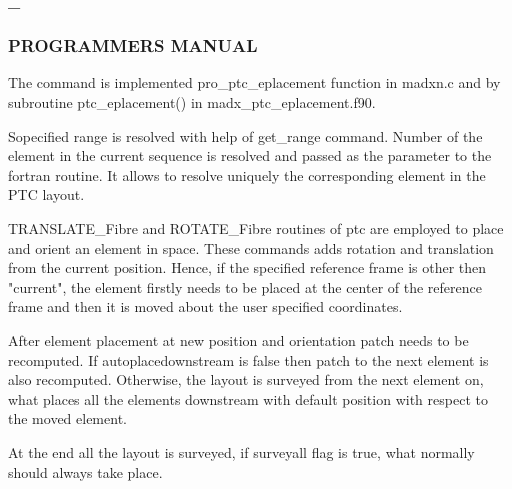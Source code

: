 \paragraph{\_  }




\subsubsection{ PROGRAMMERS MANUAL }

  The command is implemented pro\_ptc\_eplacement function in madxn.c and  by subroutine ptc\_eplacement() in madx\_ptc\_eplacement.f90. 

 Sopecified range is resolved with help of get\_range command. Number of the element in the current sequence is resolved and passed as the parameter to the fortran routine. It allows to resolve uniquely the corresponding element in the PTC layout. 

 TRANSLATE\_Fibre and ROTATE\_Fibre routines of ptc are employed to place and orient an element in space. These commands adds rotation and translation from the current position. Hence, if the specified reference frame is other then "current", the element firstly needs to be placed at the center of the reference frame and then it is moved about the user specified coordinates.  

 After element placement at new position and orientation patch needs to be recomputed. If autoplacedownstream is false then patch to the next element is also recomputed. Otherwise, the layout is surveyed from the next element on, what places all the elements downstream with default position with respect to the moved element. 

 At the end all the layout is surveyed, if surveyall flag is true, what normally should always take place.     


